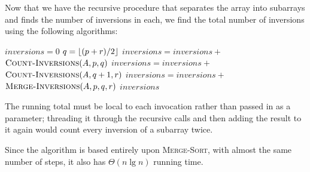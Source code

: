 \begin{itemize}
    Now that we have the recursive procedure that separates the array
    into subarrays
    and finds the number of inversions in each, we find the total
    number of inversions
    using the following algorithms:

    \begin{algorithmic}[1]
      \STATE $\mathit{inversions} = 0$
      \STATE $q = \lfloor(p + r)/2\rfloor$
      \STATE $\mathit{inversions} = \mathit{inversions} + {}$ \\
      \hspace*{2em}$\textsc{Count-Inversions}(A, p, q)$
      \STATE $\mathit{inversions} = \mathit{inversions} + {}$ \\
      \hspace*{2em}$\textsc{Count-Inversions}(A, q + 1, r)$
      \STATE $\mathit{inversions} = \mathit{inversions} + {}$ \\
      \hspace*{2em}$\textsc{Merge-Inversions}(A, p, q, r)$
      \ENDIF
      \RETURN $\mathit{inversions}$
    \end{algorithmic}

    The running total must be local to each invocation rather than passed in as
    a parameter; threading it through the recursive calls and then adding the
    result to it again would count every inversion of a subarray twice.

    Since the algorithm is based entirely upon \textsc{Merge-Sort},
    with almost the
    same number of steps, it also has $\Theta(n\lg{n})$ running time.
\end{itemize}

